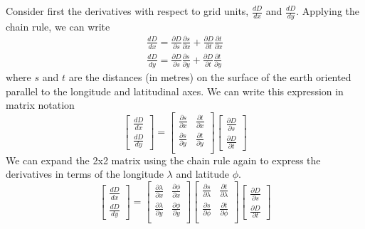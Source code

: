 \documentclass[a4paper,10pt]{article}
\begin{document}
Consider first the derivatives with respect to grid units, $\frac{dD}{dx}$ and $\frac{dD}{dy}$. Applying the chain rule, we can write
\begin{subequations}\begin{align}
\frac{dD}{dx} = \frac {\partial D}{\partial s}\frac {\partial s}{\partial x}  +
       \frac {\partial D}{\partial t}\frac {\partial t}{\partial x} \\
\frac{dD}{dy} = \frac {\partial D}{\partial s}\frac {\partial s}{\partial y}  +
       \frac {\partial D}{\partial t}\frac {\partial t}{\partial y}
\end{align}\end{subequations}
where $s$ and $t$ are the distances (in metres) on the surface of the earth oriented parallel to the longitude and latitudinal axes. We can write this expression in matrix notation
\begin{equation}
\left[\begin{matrix} 
	  \frac{dD}{dx} \\ 
	  \frac{dD}{dy} 
	  \end{matrix}\right] 
= \left[\begin{matrix} 
         \frac {\partial s}{\partial x}  & \frac {\partial t}{\partial x} \\
         \frac {\partial s}{\partial y}  & \frac {\partial t}{\partial y} \\
        \end{matrix}\right]
 \left[\begin{matrix} 
         \frac {\partial D}{\partial s}  \\
         \frac {\partial D}{\partial t}  
        \end{matrix}\right]
\end{equation}
We can expand the 2x2 matrix using the chain rule again to express the derivatives in terms of the longitude $\lambda$ and latitude $\phi$.
\begin{equation}
\left[\begin{matrix} 
	  \frac{dD}{dx} \\ 
	  \frac{dD}{dy} 
	  \end{matrix}\right] 
= \left[\begin{matrix} 
         \frac {\partial \lambda}{\partial x}  & \frac {\partial \phi}{\partial x} \\
         \frac {\partial \lambda}{\partial y}  & \frac {\partial \phi}{\partial y} \\
        \end{matrix}\right]
 \left[\begin{matrix} 
         \frac {\partial s}{\partial \lambda}  & \frac {\partial t}{\partial \lambda} \\
         \frac {\partial s}{\partial \phi}  & \frac {\partial t}{\partial \phi} \\
        \end{matrix}\right]
 \left[\begin{matrix} 
         \frac {\partial D}{\partial s}  \\
         \frac {\partial D}{\partial t}  
        \end{matrix}\right]
\end{equation}
\end{document}
